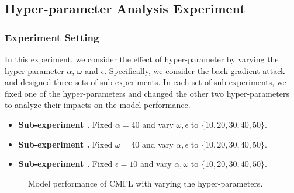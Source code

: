 \documentclass[10pt,journal,compsoc]{IEEEtran}
\begin{document}
\subsection{Hyper-parameter Analysis Experiment}\label{parameterAnalysisExperiment}

\subsubsection{Experiment Setting}

In this experiment, we consider the effect of hyper-parameter by varying the hyper-parameter $\alpha$, $\omega$ and $\epsilon$. Specifically, we consider the back-gradient attack and designed three sets of sub-experiments. In each set of sub-experiments, we fixed one of the hyper-parameters and changed the other two hyper-parameters to analyze their impacts on the model performance.

\begin{itemize}
	\item \textbf{Sub-experiment \uppercase\expandafter{}.} Fixed $\alpha=40$ and vary $\omega, \epsilon$ to $\{10,20,30,40,50\}$.
	\item \textbf{Sub-experiment \uppercase\expandafter{}.} Fixed $\omega=40$ and vary $\alpha, \epsilon$ to $\{10,20,30,40,50\}$.
	\item \textbf{Sub-experiment \uppercase\expandafter{}.} Fixed $\epsilon=10$ and vary $\alpha, \omega$ to $\{10,20,30,40,50\}$.
\end{itemize}

\begin{figure*}[htbp]
	\centering
	
	
	\centering
	\caption{Model performance of CMFL with varying the hyper-parameters.}
	\label{fig:EXP2}
\end{figure*}
\end{document}
